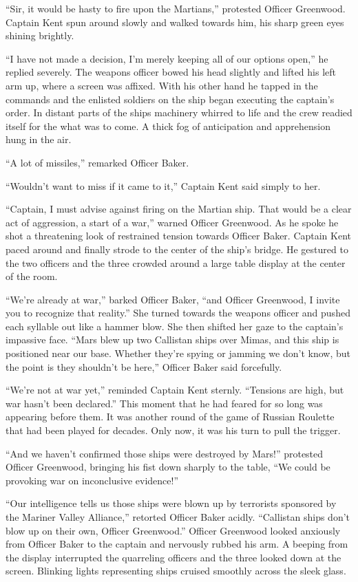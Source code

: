 \documentclass[12pt]{article} %
\begin{document}
``Sir, it would be hasty to fire upon the Martians,'' protested Officer Greenwood. Captain Kent spun around slowly and walked towards him, his sharp green eyes shining brightly.

``I have not made a decision, I'm merely keeping all of our options open,'' he replied severely. The weapons officer bowed his head slightly and lifted his left arm up, where a screen was affixed. With his other hand he tapped in the commands and the enlisted soldiers on the ship began executing the captain's order. In distant parts of the ships machinery whirred to life and the crew readied itself for the what was to come. A thick fog of anticipation and apprehension hung in the air.

``A lot of missiles,'' remarked Officer Baker. 

``Wouldn't want to miss if it came to it,'' Captain Kent said simply to her.

``Captain, I must advise against firing on the Martian ship. That would be a clear act of aggression, a start of a war,'' warned Officer Greenwood. As he spoke he shot a threatening look of restrained tension towards Officer Baker. Captain Kent paced around and finally strode to the center of the ship's bridge. He gestured to the two officers and the three crowded around a large table display at the center of the room.

``We're already at war,'' barked Officer Baker, ``and Officer Greenwood, I invite you to recognize that reality.'' She turned towards the weapons officer and pushed each syllable out like a hammer blow. She then shifted her gaze to the captain's impassive face. ``Mars blew up two Callistan ships over Mimas, and this ship is positioned near our base. Whether they're spying or jamming we don't know, but the point is they shouldn't be here,'' Officer Baker said forcefully.

``We're not at war yet,'' reminded Captain Kent sternly. ``Tensions are high, but war hasn't been declared.'' This moment that he had feared for so long was appearing before them. It was another round of the game of Russian Roulette that had been played for decades. Only now, it was his turn to pull the trigger.

``And we haven't confirmed those ships were destroyed by Mars!'' protested Officer Greenwood,  bringing his fist down sharply to the table, ``We could be provoking war on inconclusive evidence!''

``Our intelligence tells us those ships were blown up by terrorists sponsored by the Mariner Valley Alliance,'' retorted Officer Baker acidly. ``Callistan ships don't blow up on their own, Officer Greenwood.'' Officer Greenwood looked anxiously from Officer Baker to the captain and nervously rubbed his arm. A beeping from the display interrupted the quarreling officers and the three looked down at the screen. Blinking lights representing ships cruised smoothly across the sleek glass.
\end{document}
